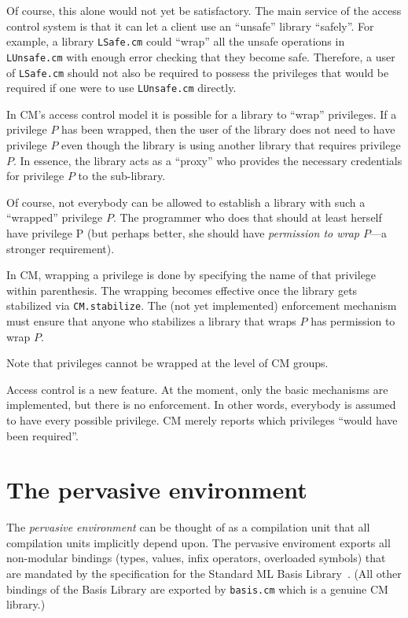 \documentclass{article}
\begin{document}
Of course, this alone would not yet be satisfactory.  The main service
of the access control system is that it can let a client use an
``unsafe'' library ``safely''.  For example, a library {\tt LSafe.cm}
could ``wrap'' all the unsafe operations in {\tt LUnsafe.cm} with
enough error checking that they become safe.  Therefore, a user of
{\tt LSafe.cm} should not also be required to possess the privileges
that would be required if one were to use {\tt LUnsafe.cm} directly.

In CM's access control model it is possible for a library to ``wrap''
privileges.  If a privilege $P$ has been wrapped, then the user of the
library does not need to have privilege $P$ even though the library is
using another library that requires privilege $P$.  In essence, the
library acts as a ``proxy'' who provides the necessary credentials for
privilege $P$ to the sub-library.

Of course, not everybody can be allowed to establish a library with
such a ``wrapped'' privilege $P$.  The programmer who does that should at
least herself have privilege P (but perhaps better, she should have
{\em permission to wrap $P$}---a stronger requirement).

In CM, wrapping a privilege is done by specifying the name of that
privilege within parenthesis.  The wrapping becomes effective once the
library gets stabilized via {\tt CM.stabilize}.  The (not yet
implemented) enforcement mechanism must ensure that anyone who
stabilizes a library that wraps $P$ has permission to wrap $P$.

Note that privileges cannot be wrapped at the level of CM groups.

Access control is a new feature. At the moment, only the basic
mechanisms are implemented, but there is no enforcement.  In other
words, everybody is assumed to have every possible privilege.  CM
merely reports which privileges ``would have been required''.

\section{The pervasive environment}

The {\em pervasive environment} can be thought of as a compilation
unit that all compilation units implicitly depend upon.  The pervasive
enviroment exports all non-modular bindings (types, values, infix
operators, overloaded symbols) that are mandated by the specification
for the Standard ML Basis Library~\cite{reppy99:basis}.  (All other
bindings of the Basis Library are exported by {\tt basis.cm} which is
a genuine CM library.)
\end{document}
